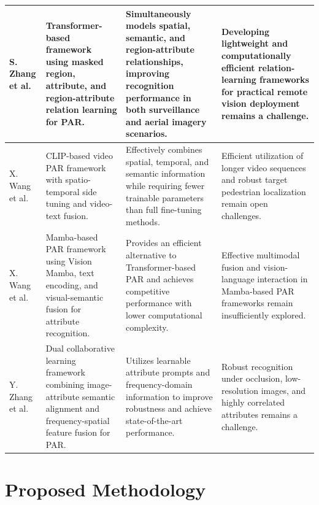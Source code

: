 \documentclass{ieeeaccess}
\begin{document}
\begin{table}[htbp]
{\begin{tabular}{|p{2cm}|p{4cm}|p{4cm}|p{4cm}|}
                \hline
                S. Zhang et al.\cite{bib15} & Transformer-based framework using masked region, attribute, and region-attribute relation learning for PAR. & Simultaneously models spatial, semantic, and region-attribute relationships, improving recognition performance in both surveillance and aerial imagery scenarios. & Developing lightweight and computationally efficient relation-learning frameworks for practical remote vision deployment remains a challenge. \\
                \hline
                X. Wang et al.\cite{bib16} & CLIP-based video PAR framework with spatio-temporal side tuning and video-text fusion. & Effectively combines spatial, temporal, and semantic information while requiring fewer trainable parameters than full fine-tuning methods. & Efficient utilization of longer video sequences and robust target pedestrian localization remain open challenges.\\
                \hline
                 X. Wang et al.\cite{bib17} & Mamba-based PAR framework using Vision Mamba, text encoding, and visual-semantic fusion for attribute recognition. & Provides an efficient alternative to Transformer-based PAR and achieves competitive performance with lower computational complexity.& Effective multimodal fusion and vision-language interaction in Mamba-based PAR frameworks remain insufficiently explored. \\
                \hline
                Y. Zhang et al.\cite{bib18} & Dual collaborative learning framework combining image-attribute semantic alignment and frequency-spatial feature fusion for PAR. & Utilizes learnable attribute prompts and frequency-domain information to improve robustness and achieve state-of-the-art performance.& Robust recognition under occlusion, low-resolution images, and highly correlated attributes remains a challenge.\\
                \hline

            \end{tabular}
        }
    \end{table}

\section{Proposed Methodology}
\end{document}
